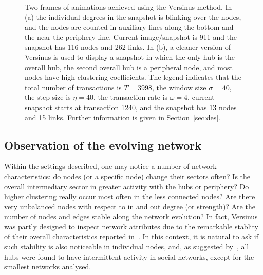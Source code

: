 \documentclass[runningheads]{llncs}
\begin{document}
\begin{figure}[!h]\centering
    \qquad
    \caption{Two frames of animations achieved using the Versinus method. In (a) the individual degrees in the snapshot is blinking over the nodes, and the nodes are counted in auxiliary lines along the bottom and the near the periphery line. Current image/snapshot is 911 and the snapshot has 116 nodes and 262 links.
   In (b), a cleaner version of Versinus is used to display a snapshot in which the only hub is the overall hub, the second overall hub is a peripheral node, and most nodes have high clustering coefficients. The legend indicates that the total number of transactions is $T=3998$, the window size $\sigma=40$, the step size is $\eta=40$, the transaction rate is $\omega=4$, current snapshot starts at transaction 1240, and the snapshot has 13 nodes and 15 links.
   Further information is given in Section~\ref{sec:des}.
   }%
    \label{fig:final}%
\end{figure}

\subsection{Observation of the evolving network}
Within the settings described, one may notice a number of network characteristics: do nodes (or a specific node) change their sectors often? Is the overall intermediary sector in greater activity with the hubs or periphery?
Do higher clustering really occur most often in the less connected nodes?
Are there very unbalanced nodes with respect to in and out degree (or strength)?
Are the number of nodes and edges stable along the network evolution?
In fact, Versinus was partly designed to inspect network attributes due to the remarkable stablity of their overall characteristics reported in~\cite{stab}.
In this context, it is natural to ask if such stability is also noticeable in individual nodes, and, 
as suggested by~\cite{barabasiEvo}, all hubs were found to have intermittent activity in social networks, except for the smallest networks analysed.
\end{document}
